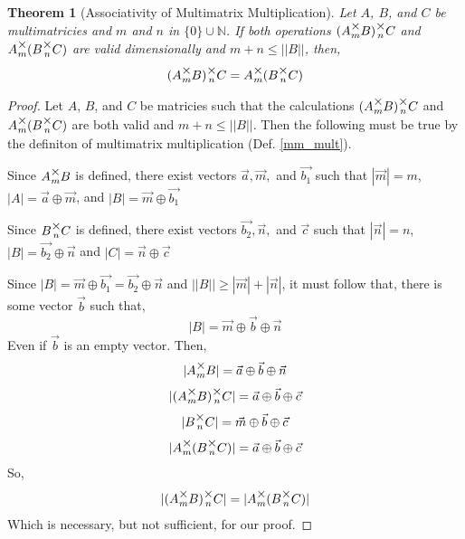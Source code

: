 \documentclass[12pt]{book}
\theoremstyle{definition}
\theoremstyle{plain}
\newtheorem{theorem}{Theorem}[chapter]
\theoremstyle{ppart}
\theoremstyle{case}
\theoremstyle{solution}
\newcommand{\mmult}[1]{\text{\raisebox{1ex}{$\underset{#1}{\times}$}}}
\begin{document}
\begin{theorem}[Associativity of Multimatrix Multiplication]
\label{mm_associativity}
Let $A$, $B$, and $C$ be multimatricies and $m$ and $n$ in
$\{0\} \cup \mathbb{N}$.
If both operations $(A \mmult{m} B) \mmult{n} C$ and $A \mmult{m} (B \mmult{n} C)$
are valid dimensionally and $m+n \le ||B||$, then,
\[ (A \mmult{m} B) \mmult{n} C = A \mmult{m} (B \mmult{n} C) \]
\end{theorem}
\begin{proof}
Let $A$, $B$, and $C$ be matricies such that the calculations
$(A \mmult{m} B) \mmult{n} C$ and $A \mmult{m} (B \mmult{n} C)$ are both valid
and $m + n \le ||B||$.
Then the following must be true by the definiton of multimatrix multiplication
(Def. \ref{mm_mult}).

Since $A \mmult{m} B$ is defined, there exist vectors $\vec{a}, \vec{m},$ and
$\vec{b_1}$ such that 
$|\vec{m}| = m$,
$|A| = \vec{a} \oplus \vec{m}$,
and
$|B| = \vec{m} \oplus \vec{b_1}$

Since $B \mmult{n} C$ is defined, there exist vectors $\vec{b_2}, \vec{n},$ and
$\vec{c}$ such that
$|\vec{n}| = n$,
$|B| = \vec{b_2} \oplus \vec{n}$
and
$|C| = \vec{n} \oplus \vec{c}$

Since $|B| = \vec{m} \oplus \vec{b_1} = \vec{b_2} \oplus \vec{n}$ and
$||B|| \ge |\vec{m}| + |\vec{n}|$, it must follow that, there is some vector $\vec{b}$
such that,
\[
 |B| = \vec{m} \oplus \vec{b} \oplus \vec{n}
\]
Even if $\vec{b}$ is an empty vector. Then,
\[ |A \mmult{m} B| = \vec{a} \oplus \vec{b} \oplus \vec{n} \]
\[ |(A \mmult{m} B) \mmult{n} C| = \vec{a} \oplus \vec{b} \oplus \vec{c} \]
\[ |B \mmult{n} C| = \vec{m} \oplus \vec{b} \oplus \vec{c} \]
\[ |A \mmult{m} (B \mmult{n} C)| = \vec{a} \oplus \vec{b} \oplus \vec{c} \]
So,
\[ |(A \mmult{m} B) \mmult{n} C| = |A \mmult{m} (B \mmult{n} C)| \]
Which is necessary, but not sufficient, for our proof.


\end{proof}
\end{document}

